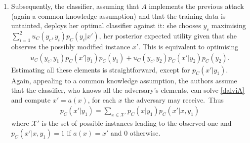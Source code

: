 \begin{enumerate}
%
%


\item Subsequently, the classifier, assuming that $A$ implements the previous attack (again a common knowledge assumption) and that the training data is untainted, deploys her optimal classifier against it:
she chooses $y_c$ maximising $\sum_{i=1}^2 u_C(y_c, y_i) p_C(y_i |x')$, her posterior expected utility given that she observes the possibly modified instance $x'$. This is equivalent to optimising 
%
\begin{eqnarray}\label{dalviCK}
u_C (y_c, y_1) p_C(x' |y_1) p_C(y_1) + u_C (y_c, y_2) p_C(x' |y_2) p_C(y_2).
\end{eqnarray}
%
Estimating all these elements is straightforward, except for $p_C(x' \vert y_1)$. Again, appealing to a common knowledge assumption, the authors assume that the classifier, who knows all the adversary's elements, can solve 
\eqref{dalviA} and compute $x' = a(x)$, for each $x$ the adversary may receive.~Thus
%
\begin{eqnarray*} 
p_C(x' |y_1) = \sum_{x \in \mathcal{X}'} p_C (x \vert y_1) p_C (x' \vert x, y_1)
\end{eqnarray*}
where $\mathcal{X}'$ is the set of possible instances leading to the observed one and $p_C(x' \vert x, y_1) = 1$ if $a(x) = x'$ and 0 otherwise.
%
%
\end{enumerate}
